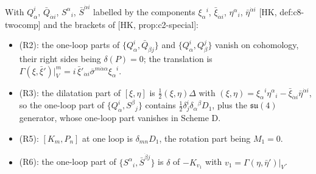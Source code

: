 \begin{remark}
With $Q^i_\alpha$, $\bar Q_{\dot\alpha i}$, $S^\alpha{}_i$, $\bar S^{\dot\alpha i}$ labelled by the components $\xi_\alpha{}^i$, $\bar\xi_{\dot\alpha i}$, $\eta^\alpha{}_i$, $\bar\eta^{\dot\alpha i}$ [HK, def:c8-twocomp] and the brackets of [HK, prop:c2-special]:
\begin{itemize}
\item (R2): the one-loop parts of $\{Q^i_\alpha,\bar Q_{\dot\beta j}\}$ and $\{Q^i_\alpha,Q^j_\beta\}$ vanish on cohomology, their right sides being $\delta(P)=0$; the translation is $\Gamma(\xi,\bar\xi')|_V^m=i\,\bar\xi'_{\dot\alpha i}\bar\sigma^{m\dot\alpha\alpha}\xi_\alpha{}^i$.
\item (R3): the dilatation part of $[\xi,\eta]$ is $\frac12(\xi,\eta)\Delta$ with $(\xi,\eta)=\xi_\alpha{}^i\eta^\alpha{}_i-\bar\xi_{\dot\alpha i}\bar\eta^{\dot\alpha i}$, so the one-loop part of $\{Q^i_\alpha,S^\beta{}_j\}$ contains $\frac12\delta^i_j\delta_\alpha{}^\beta D_1$, plus the $\mathfrak{su}(4)$ generator, whose one-loop part vanishes in Scheme D.
\item (R5): $[K_m,P_n]$ at one loop is $\delta_{mn}D_1$, the rotation part being $M_1=0$.
\item (R6): the one-loop part of $\{S^\alpha{}_i,\bar S^{\dot\beta j}\}$ is $\delta$ of $-K_{v_1}$ with $v_1=\Gamma(\eta,\bar\eta')|_V$.
\end{itemize}
\end{remark}
